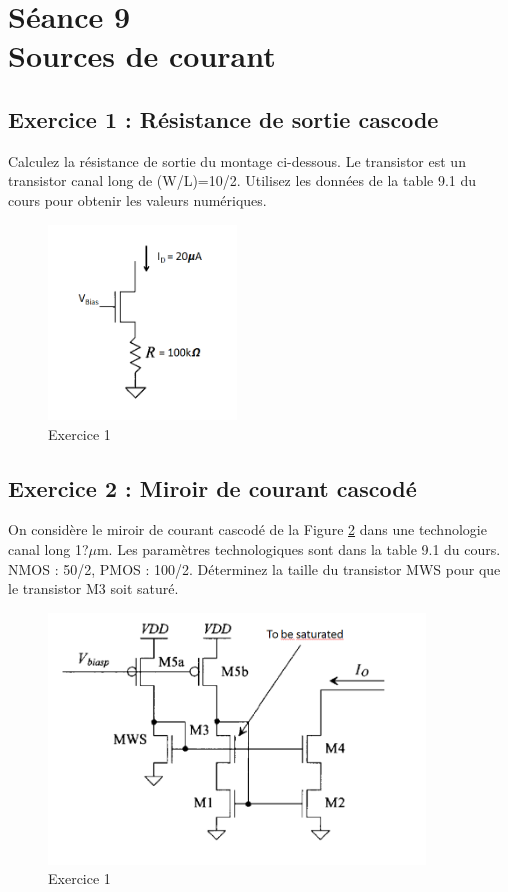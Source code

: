\documentclass[paper=a4, fontsize=11pt]{article} %
\numberwithin{equation}{section} %
\numberwithin{figure}{section} %
\numberwithin{table}{section} %
\begin{document}
\newpage
\setcounter{figure}{0}
\setcounter{section}{9}
\section{Séance 9\\Sources de courant}
\subsection*{Exercice 1 : Résistance de sortie cascode}
Calculez la résistance de sortie du montage ci-dessous. Le transistor est un transistor canal long de (W/L)=10/2. Utilisez les données de la table 9.1 du cours pour obtenir les valeurs numériques.

\begin{figure}[!htbp]
   \centering
   \includegraphics[width=5cm]{figure/fig10-1.png}
   \caption{Exercice 1}
   \label{fig10-1}
\end{figure}

\subsection*{Exercice 2 : Miroir de courant cascodé}
On considère le miroir de courant cascodé de la Figure \ref{fig10-2} dans une technologie canal long 1?$\mu$m. Les paramètres technologiques sont dans la table 9.1 du cours. NMOS : 50/2, PMOS : 100/2.
Déterminez la taille du transistor MWS pour que le transistor M3 soit saturé.

\begin{figure}[!htbp]
   \centering
   \includegraphics[width=10cm]{figure/fig10-2.png}
   \caption{Exercice 1}
   \label{fig10-2}
\end{figure}
\end{document}
